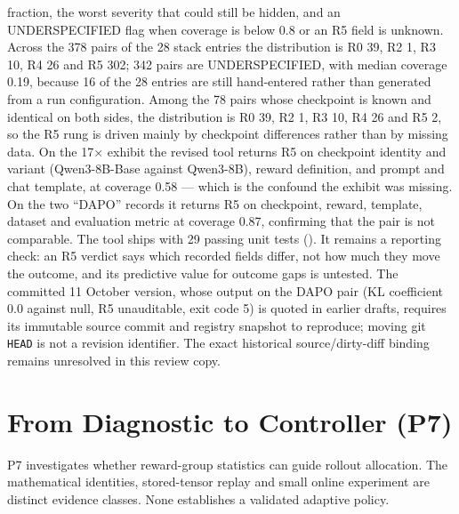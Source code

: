 \documentclass[12pt,a4paper]{report}
\DeclareRobustCommand{\longtok}[1]{\texttt{\seqsplit{#1}}}
\begin{document}
fraction, the worst severity that could still be hidden, and an
UNDERSPECIFIED flag when coverage is below 0.8 or an R5 field is
unknown. Across the 378 pairs of the 28 stack entries the distribution
is R0 39, R2 1, R3 10, R4 26 and R5 302; 342 pairs are UNDERSPECIFIED,
with median coverage 0.19, because 16 of the 28 entries are still
hand-entered rather than generated from a run configuration. Among the
78 pairs whose checkpoint is known and identical on both sides, the
distribution is R0 39, R2 1, R3 10, R4 26 and R5 2, so the R5 rung is
driven mainly by checkpoint differences rather than by missing data. On
the 17× exhibit the revised tool returns R5 on checkpoint identity and
variant (Qwen3-8B-Base against Qwen3-8B), reward definition, and prompt
and chat template, at coverage 0.58 --- which is the confound the
exhibit was missing. On the two ``DAPO'' records it returns R5 on
checkpoint, reward, template, dataset and evaluation metric at coverage
0.87, confirming that the pair is not comparable. The tool ships with 29
passing unit tests (\longtok{tests/test\_\allowbreak{}registry\_\allowbreak{}stackdiff.py}). It
remains a reporting check: an R5 verdict says which recorded fields
differ, not how much they move the outcome, and its predictive value for
outcome gaps is untested. The committed 11 October version, whose output
on the DAPO pair (KL coefficient 0.0 against null, R5 unauditable, exit
code 5) is quoted in earlier drafts, requires its immutable source
commit and registry snapshot to reproduce; moving git \texttt{HEAD} is
not a revision identifier. The exact historical source/dirty-diff
binding remains unresolved in this review copy.

\section{From Diagnostic to Controller
(P7)}\label{from-diagnostic-to-controller-p7}

P7 investigates whether reward-group statistics can guide rollout
allocation. The mathematical identities, stored-tensor replay and small
online experiment are distinct evidence classes. None establishes a
validated adaptive policy.
\end{document}

